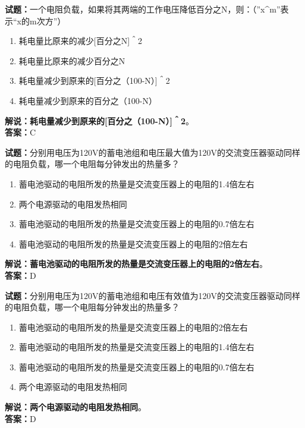 \documentclass{ctexbook}
\begin{document}
\vspace{1em}

\textbf{试题：}一个电阻负载，如果将其两端的工作电压降低百分之N，则：（”x\string^m”表示“x的m次方”）
\begin{enumerate}[leftmargin=3em]
  \item 耗电量比原来的减少[百分之N]＾2
  \item 耗电量比原来的减少百分之N
  \item 耗电量减少到原来的[百分之（100-N）]＾2
  \item 耗电量减少到原来的百分之（100-N）
\end{enumerate}
\noindent\textbf{解说：}\textbf{耗电量减少到原来的[百分之（100-N）]＾2}。\\\noindent\textbf{答案：}C

\vspace{1em}

\textbf{试题：}分别用电压为120V的蓄电池组和电压最大值为120V的交流变压器驱动同样的电阻负载，哪一个电阻每分钟发出的热量多？
\begin{enumerate}[leftmargin=3em]
  \item 蓄电池驱动的电阻所发的热量是交流变压器上的电阻的1.4倍左右
  \item 两个电源驱动的电阻发热相同
  \item 蓄电池驱动的电阻所发的热量是交流变压器上的电阻的0.7倍左右
  \item 蓄电池驱动的电阻所发的热量是交流变压器上的电阻的2倍左右
\end{enumerate}
\noindent\textbf{解说：}\textbf{蓄电池驱动的电阻所发的热量是交流变压器上的电阻的2倍左右}。\\\noindent\textbf{答案：}D

\vspace{1em}

\textbf{试题：}分别用电压为120V的蓄电池组和电压有效值为120V的交流变压器驱动同样的电阻负载，哪一个电阻每分钟发出的热量多？
\begin{enumerate}[leftmargin=3em]
  \item 蓄电池驱动的电阻所发的热量是交流变压器上的电阻的2倍左右
  \item 蓄电池驱动的电阻所发的热量是交流变压器上的电阻的1.4倍左右
  \item 蓄电池驱动的电阻所发的热量是交流变压器上的电阻的0.7倍左右
  \item 两个电源驱动的电阻发热相同
\end{enumerate}
\noindent\textbf{解说：}\textbf{两个电源驱动的电阻发热相同}。\\\noindent\textbf{答案：}D
\end{document}
